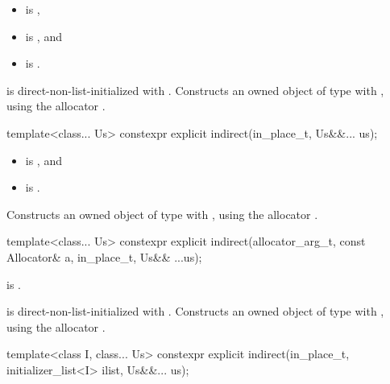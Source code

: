 \begin{itemdescr}
\pnum
\constraints
\begin{itemize}
\item
{} is ,
\item
{} is , and
\item
{} is .
\end{itemize}

\pnum
\effects
{} is direct-non-list-initialized with .
Constructs an owned object of type  with
,
using the allocator .
\end{itemdescr}

%
\begin{itemdecl}
template<class... Us>
  constexpr explicit indirect(in_place_t, Us&&... us);
\end{itemdecl}

\begin{itemdescr}
\pnum
\constraints
\begin{itemize}
\item
{} is , and
\item
{} is .
\end{itemize}

\pnum
\effects
Constructs an owned object of type  with
,
using the allocator .
\end{itemdescr}

%
\begin{itemdecl}
template<class... Us>
  constexpr explicit indirect(allocator_arg_t, const Allocator& a,
                              in_place_t, Us&& ...us);
\end{itemdecl}

\begin{itemdescr}
\pnum
\constraints
{} is .

\pnum
\effects
{} is direct-non-list-initialized with .
Constructs an owned object of type  with
,
using the allocator .
\end{itemdescr}

%
\begin{itemdecl}
template<class I, class... Us>
  constexpr explicit indirect(in_place_t, initializer_list<I> ilist, Us&&... us);
\end{itemdecl}

